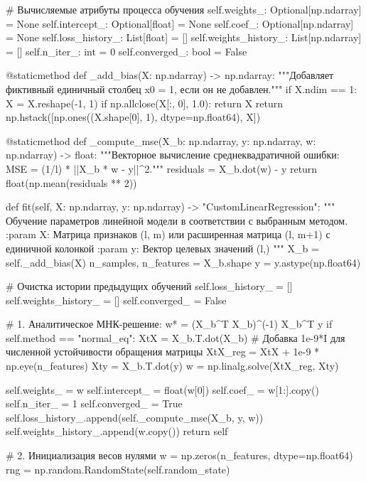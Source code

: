 \documentclass[14pt,a4paper]{extarticle}
\begin{document}
\begin{CodeListing}
        # Вычисляемые атрибуты процесса обучения
        self.weights_: Optional[np.ndarray] = None
        self.intercept_: Optional[float] = None
        self.coef_: Optional[np.ndarray] = None
        self.loss_history_: List[float] = []
        self.weights_history_: List[np.ndarray] = []
        self.n_iter_: int = 0
        self.converged_: bool = False

    @staticmethod
    def _add_bias(X: np.ndarray) -> np.ndarray:
        """Добавляет фиктивный единичный столбец x0 = 1, если он не добавлен."""
        if X.ndim == 1:
            X = X.reshape(-1, 1)
        if np.allclose(X[:, 0], 1.0):
            return X
        return np.hstack([np.ones((X.shape[0], 1), dtype=np.float64), X])

    @staticmethod
    def _compute_mse(X_b: np.ndarray, y: np.ndarray, w: np.ndarray) -> float:
        """Векторное вычисление среднеквадратичной ошибки: MSE = (1/l) * ||X_b * w - y||^2."""
        residuals = X_b.dot(w) - y
        return float(np.mean(residuals ** 2))

    def fit(self, X: np.ndarray, y: np.ndarray) -> "CustomLinearRegression":
        """
        Обучение параметров линейной модели в соответствии с выбранным методом.
        :param X: Матрица признаков (l, m) или расширенная матрица (l, m+1) с единичной колонкой
        :param y: Вектор целевых значений (l,)
        """
        X_b = self._add_bias(X)
        n_samples, n_features = X_b.shape
        y = y.astype(np.float64)

        # Очистка истории предыдущих обучений
        self.loss_history_ = []
        self.weights_history_ = []
        self.converged_ = False

        # 1. Аналитическое МНК-решение: w* = (X_b^T X_b)^(-1) X_b^T y
        if self.method == "normal_eq":
            XtX = X_b.T.dot(X_b)
            # Добавка 1e-9*I для численной устойчивости обращения матрицы
            XtX_reg = XtX + 1e-9 * np.eye(n_features)
            Xty = X_b.T.dot(y)
            w = np.linalg.solve(XtX_reg, Xty)

            self.weights_ = w
            self.intercept_ = float(w[0])
            self.coef_ = w[1:].copy()
            self.n_iter_ = 1
            self.converged_ = True
            self.loss_history_.append(self._compute_mse(X_b, y, w))
            self.weights_history_.append(w.copy())
            return self

        # 2. Инициализация весов нулями
        w = np.zeros(n_features, dtype=np.float64)
        rng = np.random.RandomState(self.random_state)


\end{CodeListing}
\end{document}
